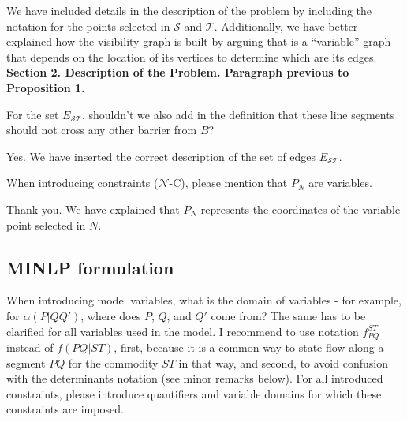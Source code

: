\documentclass{article}
\newenvironment{reviewer}{\setcounter{pointcounter}{1}}{}
\newcommand{\point}{\text{{\selectfont \thepointcounter} \stepcounter{pointcounter}}}
\begin{document}
\begin{reviewer}
		\begin{tcolorbox}[breakable,enhanced,coltitle=black,colback=green!5!white,colframe=green!75!black,title=\textbf{Answer R2.\point},borderline={1pt}{0pt}{black},boxrule=0pt]
			We have included details in the description of the problem by including the notation for the points selected in $\mathcal S$ and $\mathcal T$. Additionally, we have better explained how the visibility graph is built by arguing that is a ``variable'' graph that depends on the location of its vertices to determine which are its edges. \textbf{Section 2. Description of the Problem. Paragraph previous to Proposition 1.}
		\end{tcolorbox}
		
		\begin{itshape}
			For the set $E_{\mathcal S \mathcal T}$, shouldn't we also add in the definition that these line segments should not cross any other barrier from $B$?
		\end{itshape}
		
		\begin{tcolorbox}[breakable,enhanced,coltitle=black,colback=green!5!white,colframe=green!75!black,title=\textbf{Answer R2.\point},borderline={1pt}{0pt}{black},boxrule=0pt]
			Yes. We have inserted the correct description of the set of edges $E_{\mathcal S\mathcal T}$.
		\end{tcolorbox}
		
		\begin{itshape}
			When introducing constraints ($\mathcal N$-C), please mention that $P_N$ are variables.
		\end{itshape}
		
		\begin{tcolorbox}[breakable,enhanced,coltitle=black,colback=green!5!white,colframe=green!75!black,title=\textbf{Answer R2.\point},borderline={1pt}{0pt}{black},boxrule=0pt]
			Thank you. We have explained that $P_N$ represents the coordinates of the variable point selected in $N$.
		\end{tcolorbox}
		
		\subsection*{MINLP formulation}
		\begin{itshape}
			When introducing model variables, what is the domain of variables - for example, for $\alpha(P|QQ')$, where does $P$, $Q$, and $Q'$ come from? The same has to be clarified for all variables used in the model. I recommend to use notation $f^{ST}_{PQ}$ instead of $f(PQ|ST)$, first, because it is a common way to state flow along a segment $PQ$ for the commodity $ST$ in that way, and second, to avoid confusion with the determinants notation (see minor remarks below). For all introduced constraints, please introduce quantifiers and variable domains for which these constraints are imposed.
		\end{itshape}
		

\end{reviewer}
\end{document}
